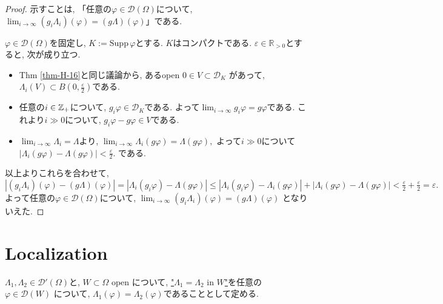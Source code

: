 \begin{proof}
示すことは, 「任意の$\varphi \in \mathcal{D}(\Omega)$について, 
$\lim_{i \to \infty} (g_i \Lambda_i)(\varphi) = (g \Lambda)(\varphi)$」である.

$\varphi \in \mathcal{D}(\Omega)$を固定し, $K := \mathrm{Supp}\,\varphi$とする. $K$はコンパクトである. 
$\varepsilon \in \mathbb{R}_{>0}$とすると, 次が成り立つ.
\begin{itemize}
\item Thm \ref{thm-H-16}と同じ議論から,  あるopen $0 \in V \subset \mathcal{D}_K$ があって, 
$\Lambda_i(V) \subset B(0,\tfrac{\varepsilon}{2})$である. 
\item 任意の$i \in \mathbb{Z}_+$について, $g_i \varphi \in \mathcal{D}_K$である. よって$\lim_{i \to \infty} g_i \varphi = g \varphi$である. これより$i \gg 0$について, $g_i \varphi - g \varphi \in V$である.
\item $\lim_{i \to \infty} \Lambda_i = \Lambda$より, 
\(
\lim_{i \to \infty} \Lambda_i(g \varphi) = \Lambda(g \varphi),
\)
よって$ i \gg 0$について
\(
|\Lambda_i(g \varphi) - \Lambda(g \varphi)| < \tfrac{\varepsilon}{2}.
\)
である.
\end{itemize}
以上よりこれらを合わせて, 
\[|(g_i \Lambda_i)(\varphi) - (g \Lambda)(\varphi)| 
= |\Lambda_i(g_i \varphi) - \Lambda(g \varphi)|
\le |\Lambda_i(g_i \varphi) - \Lambda_i(g \varphi)| + |\Lambda_i(g \varphi) - \Lambda(g \varphi)|
< \tfrac{\varepsilon}{2} + \tfrac{\varepsilon}{2} = \varepsilon.
\]
よって任意の$\varphi \in \mathcal{D}(\Omega)$について, 
$\lim_{i \to \infty} (g_i \Lambda_i)(\varphi) = (g \Lambda)(\varphi)$
となりいえた.
\end{proof}


\section{Localization}

\begin{tcolorbox}[mybox]
\begin{defn}{\cite[Def 6.19]{Rud}}
\label{defn-H-18}%
\(\Lambda_1, \Lambda_2 \in \mathcal{D}'(\Omega)\)と, 
\(W \subset \Omega\) open について, 
\underline{"\(\Lambda_1 = \Lambda_2 \text{ in } W\)"}を任意の $\varphi \in \mathcal{D}(W)$
について, \( \Lambda_1(\varphi) = \Lambda_2(\varphi) \)であることとして定める.
\end{defn}
\end{tcolorbox}

